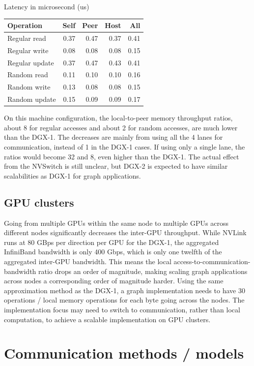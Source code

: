 \documentclass[10pt,oneside]{memoir}
\begin{document}
Latency in microsecond (us)

\begin{longtable}[]{@{}lrrrr@{}}
\toprule
Operation & Self & Peer & Host & All\tabularnewline
\midrule
\endhead
Regular read & 0.37 & 0.47 & 0.37 & 0.41\tabularnewline
Regular write & 0.08 & 0.08 & 0.08 & 0.15\tabularnewline
Regular update & 0.37 & 0.47 & 0.43 & 0.41\tabularnewline
Random read & 0.11 & 0.10 & 0.10 & 0.16\tabularnewline
Random write & 0.13 & 0.08 & 0.08 & 0.15\tabularnewline
Random update & 0.15 & 0.09 & 0.09 & 0.17\tabularnewline
\bottomrule
\end{longtable}

On this machine configuration, the local-to-peer memory throughput
ratios, about 8 for regular accesses and about 2 for random accesses,
are much lower than the DGX-1. The decreases are mainly from using all
the 4 lanes for communication, instead of 1 in the DGX-1 cases. If using
only a single lane, the ratios would become 32 and 8, even higher than
the DGX-1. The actual effect from the NVSwitch is still unclear, but
DGX-2 is expected to have similar scalabilities as DGX-1 for graph
applications.

\hypertarget{gpu-clusters}{%
\subsection{GPU clusters}\label{gpu-clusters}}

Going from multiple GPUs within the same node to multiple GPUs across
different nodes significantly decreases the inter-GPU throughput. While
NVLink runs at 80 GBps per direction per GPU for the DGX-1, the
aggregated InfiniBand bandwidth is only 400 Gbps, which is only one
twelfth of the aggregated inter-GPU bandwidth. This means the local
access-to-communication-bandwidth ratio drops an order of magnitude,
making scaling graph applications across nodes a corresponding order of
magnitude harder. Using the same approximation method as the DGX-1, a
graph implementation needs to have 30 operations / local memory
operations for each byte going across the nodes. The implementation
focus may need to switch to communication, rather than local
computation, to achieve a scalable implementation on GPU clusters.

\hypertarget{communication-methods-models}{%
\section{Communication methods /
models}\label{communication-methods-models}}
\end{document}
